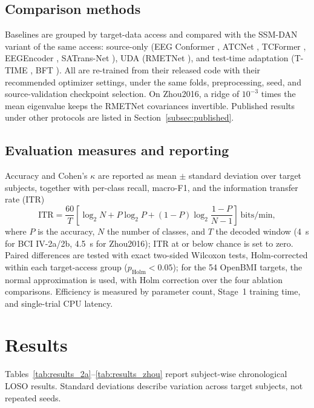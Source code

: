 \documentclass[preprint,12pt]{elsarticle}
\begin{document}
\subsection{Comparison methods}
\label{subsec:baselines}

Baselines are grouped by target-data access and compared with the SSM-DAN variant of the same access: source-only (EEG Conformer \cite{song2023eegconformer}, ATCNet \cite{altaheri2023atcnet}, TCFormer \cite{altaheri2025tcformer}, EEGEncoder \cite{liao2025eegencoder}, SATrans-Net \cite{miao2025satransnet}), UDA (RMETNet \cite{zhao2026rmetnet}), and test-time adaptation (T-TIME \cite{li2024ttime}, BFT \cite{li2026bft}). All are re-trained from their released code with their recommended optimizer settings, under the same folds, preprocessing, seed, and source-validation checkpoint selection. On Zhou2016, a ridge of $10^{-3}$ times the mean eigenvalue keeps the RMETNet covariances invertible. Published results under other protocols are listed in Section~\ref{subsec:published}.

\subsection{Evaluation measures and reporting}
\label{subsec:metrics}

Accuracy and Cohen's $\kappa$ are reported as mean $\pm$ standard deviation over target subjects, together with per-class recall, macro-F1, and the information transfer rate (ITR) \cite{wolpaw2002bci}
\begin{equation}
\mathrm{ITR}=\frac{60}{T}\left[\log_2 N+P\log_2 P+(1-P)\log_2\frac{1-P}{N-1}\right]\ \text{bits/min},
\label{eq:itr}
\end{equation}
where $P$ is the accuracy, $N$ the number of classes, and $T$ the decoded window (4~s for BCI IV-2a/2b, 4.5~s for Zhou2016); ITR at or below chance is set to zero. Paired differences are tested with exact two-sided Wilcoxon tests, Holm-corrected within each target-access group ($p_\mathrm{Holm}<0.05$); for the 54 OpenBMI targets, the normal approximation is used, with Holm correction over the four ablation comparisons. Efficiency is measured by parameter count, Stage~1 training time, and single-trial CPU latency.

\section{Results}
\label{sec:results}

Tables~\ref{tab:results_2a}--\ref{tab:results_zhou} report subject-wise chronological LOSO results. Standard deviations describe variation across target subjects, not repeated seeds.
\end{document}
